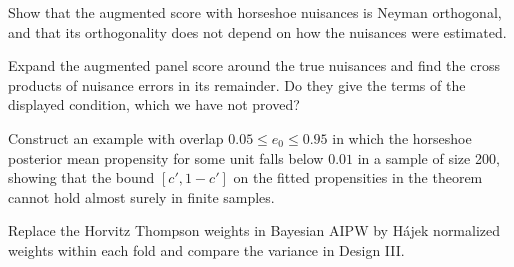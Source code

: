 \begin{exercises}
\item\label{ex:chbaipw:1} Show that the augmented score with horseshoe nuisances is Neyman orthogonal, and that its orthogonality does not depend on how the nuisances were estimated.
\item\label{ex:chbaipw:2} Expand the augmented panel score around the true nuisances and find the cross products of nuisance errors in its remainder. Do they give the terms of the displayed condition, which we have not proved?
\item\label{ex:chbaipw:3} Construct an example with overlap $0.05 \leq e_0 \leq 0.95$ in which the horseshoe posterior mean propensity for some unit falls below $0.01$ in a sample of size 200, showing that the bound $[c', 1 - c']$ on the fitted propensities in the theorem cannot hold almost surely in finite samples.
\item\label{ex:chbaipw:4} Replace the Horvitz Thompson weights in Bayesian AIPW by H\'ajek normalized weights within each fold and compare the variance in Design III.
\end{exercises}
